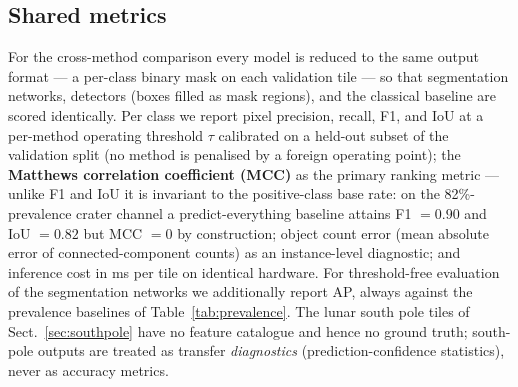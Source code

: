 \subsection{Shared metrics}
\label{sec:metrics_protocol}

For the cross-method comparison every model is reduced to the same output format --- a per-class binary mask on each validation tile --- so that segmentation networks, detectors (boxes filled as mask regions), and the classical baseline are scored identically. Per class we report pixel precision, recall, F1, and IoU at a per-method operating threshold $\tau$ calibrated on a held-out subset of the validation split (no method is penalised by a foreign operating point); the \textbf{Matthews correlation coefficient (MCC)} as the primary ranking metric --- unlike F1 and IoU it is invariant to the positive-class base rate: on the 82\%-prevalence crater channel a predict-everything baseline attains F1 $=0.90$ and IoU $=0.82$ but MCC $=0$ by construction; object count error (mean absolute error of connected-component counts) as an instance-level diagnostic; and inference cost in ms per tile on identical hardware. For threshold-free evaluation of the segmentation networks we additionally report AP, always against the prevalence baselines of Table~\ref{tab:prevalence}. The lunar south pole tiles of Sect.~\ref{sec:southpole} have no feature catalogue and hence no ground truth; south-pole outputs are treated as transfer \emph{diagnostics} (prediction-confidence statistics), never as accuracy metrics.
